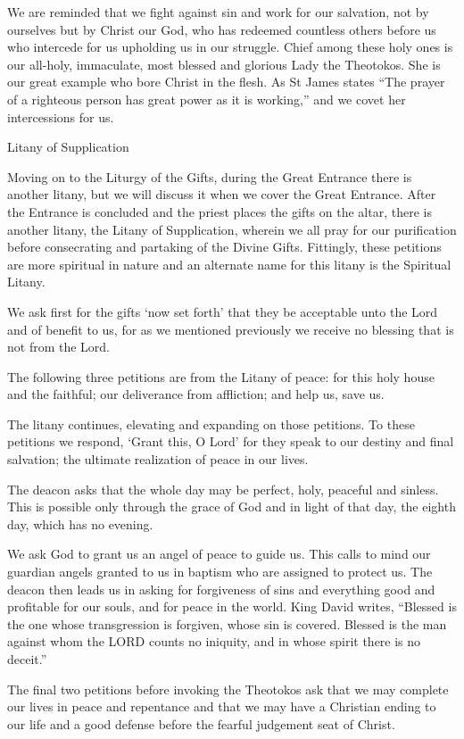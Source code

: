 \documentclass[
]{article}
\begin{document}
We are reminded that we fight against sin and work for our salvation,
not by ourselves but by Christ our God, who has redeemed countless
others before us who intercede for us upholding us in our struggle.
Chief among these holy ones is our all-holy, immaculate, most blessed
and glorious Lady the Theotokos. She is our great example who bore
Christ in the flesh. As St James states ``The prayer of a righteous
person has great power as it is working,'' and we covet her
intercessions for us.

Litany of Supplication

Moving on to the Liturgy of the Gifts, during the Great Entrance there
is another litany, but we will discuss it when we cover the Great
Entrance. After the Entrance is concluded and the priest places the
gifts on the altar, there is another litany, the Litany of Supplication,
wherein we all pray for our purification before consecrating and
partaking of the Divine Gifts. Fittingly, these petitions are more
spiritual in nature and an alternate name for this litany is the
Spiritual Litany.

We ask first for the gifts `now set forth' that they be acceptable unto
the Lord and of benefit to us, for as we mentioned previously we receive
no blessing that is not from the Lord.

The following three petitions are from the Litany of peace: for this
holy house and the faithful; our deliverance from affliction; and help
us, save us.

The litany continues, elevating and expanding on those petitions. To
these petitions we respond, `Grant this, O Lord' for they speak to our
destiny and final salvation; the ultimate realization of peace in our
lives.

The deacon asks that the whole day may be perfect, holy, peaceful and
sinless. This is possible only through the grace of God and in light of
that day, the eighth day, which has no evening.

We ask God to grant us an angel of peace to guide us. This calls to mind
our guardian angels granted to us in baptism who are assigned to protect
us. The deacon then leads us in asking for forgiveness of sins and
everything good and profitable for our souls, and for peace in the
world. King David writes, ``Blessed is the one whose transgression is
forgiven, whose sin is covered. Blessed is the man against whom the LORD
counts no iniquity, and in whose spirit there is no deceit.''

The final two petitions before invoking the Theotokos ask that we may
complete our lives in peace and repentance and that we may have a
Christian ending to our life and a good defense before the fearful
judgement seat of Christ.
\end{document}
